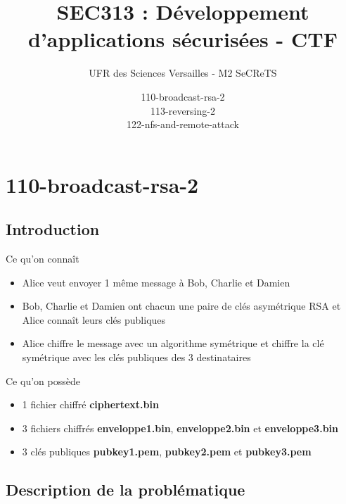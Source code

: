 \documentclass{beamer}
\title{SEC313 : Développement d'applications sécurisées - CTF}
\author{UFR des Sciences Versailles - M2 SeCReTS}
\institute{AYOUB Pierre \& CAUMES Clément \& \\ DEBROUASSE Kevin \& Mehdi MTALSI-MERIMI}
\date{110-broadcast-rsa-2 \\ 113-reversing-2 \\ 122-nfs-and-remote-attack}
\begin{document}
  \begin{frame}
  \titlepage
  \end{frame}

	\section{110-broadcast-rsa-2}
	
	\subsection{Introduction}
	
	\begin{frame}
	\begin{block}{Ce qu'on connaît} 
		\begin{itemize}
			\item Alice veut envoyer 1 même message à Bob, Charlie et Damien
			\item Bob, Charlie et Damien ont chacun une paire de clés asymétrique RSA et Alice connaît leurs clés publiques
			\item Alice chiffre le message avec un algorithme symétrique et chiffre la clé symétrique avec les clés publiques des 3 destinataires
		\end{itemize}
	\end{block}
	
	\begin{block}{Ce qu'on possède} 
		\begin{itemize}
			\item 1 fichier chiffré \textbf{ciphertext.bin}
			\item 3 fichiers chiffrés \textbf{enveloppe1.bin}, \textbf{enveloppe2.bin} et \textbf{enveloppe3.bin}
			\item 3 clés publiques \textbf{pubkey1.pem}, \textbf{pubkey2.pem} et \textbf{pubkey3.pem}
		\end{itemize}
	\end{block}
	
    \end{frame}
	
	\subsection{Description de la problématique}
	
\end{document}
